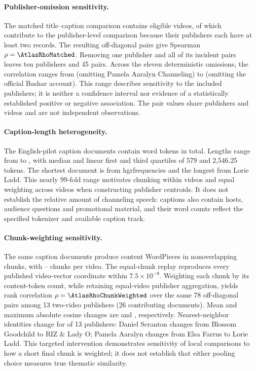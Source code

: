 \paragraph{Publisher-omission sensitivity.}
The matched title--caption comparison contains \AtlasNMatchedEligibleVideos{} eligible videos, of which \AtlasNMatchedContributingVideos{} contribute to the publisher-level comparison because their \AtlasNMatchedPublishers{} publishers each have at least two records. The resulting \AtlasNMatchedPairs{} off-diagonal pairs give Spearman $\rho=\AtlasRhoMatched$. Removing one publisher and all of its incident pairs leaves ten publishers and 45 pairs. Across the eleven deterministic omissions, the correlation ranges from \AtlasLopoMin{} (omitting Pamela Aaralyn Channeling) to \AtlasLopoMax{} (omitting the official Bashar account). This range describes sensitivity to the included publishers; it is neither a confidence interval nor evidence of a statistically established positive or negative association. The pair values share publishers and videos and are not independent observations.

\paragraph{Caption-length heterogeneity.}
The \AtlasNCaptionPilot{} English-pilot caption documents contain \AtlasCaptionWordsTotal{} word tokens in total. Lengths range from \AtlasCaptionWordsMin{} to \AtlasCaptionWordsMax{}, with median \AtlasCaptionWordsMedian{} and linear first and third quartiles of 579 and 2,546.25 tokens. The shortest document is from hgrfrequencies and the longest from Lorie Ladd. This nearly 99-fold range motivates chunking within videos and equal weighting across videos when constructing publisher centroids. It does not establish the relative amount of channeling speech: captions also contain hosts, audience questions and promotional material, and their word counts reflect the specified tokenizer and available caption track.

\paragraph{Chunk-weighting sensitivity.}
The same \AtlasNCaptionPilot{} caption documents produce \AtlasNContentWordpieces{} content WordPieces in \AtlasNWordpieceChunks{} nonoverlapping chunks, with \AtlasChunksMin{}--\AtlasChunksMax{} chunks per video. The equal-chunk replay reproduces every published video-vector coordinate within $7.5\times10^{-9}$. Weighting each chunk by its content-token count, while retaining equal-video publisher aggregation, yields rank correlation $\rho=\AtlasRhoChunkWeighted$ over the same 78 off-diagonal pairs among 13 two-video publishers (26 contributing documents). Mean and maximum absolute cosine changes are \AtlasChunkCosineMeanChange{} and \AtlasChunkCosineMaxChange{}, respectively. Nearest-neighbor identities change for \AtlasChunkNeighborChanges{} of 13 publishers: Daniel Scranton changes from Blossom Goodchild to RIZ \& Lady O; Pamela Aaralyn changes from Elsa Farrus to Lorie Ladd. This targeted intervention demonstrates sensitivity of local comparisons to how a short final chunk is weighted; it does not establish that either pooling choice measures true thematic similarity.
